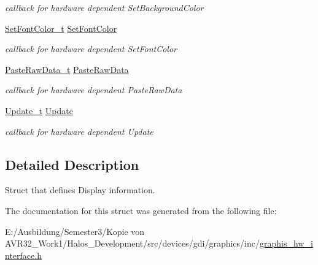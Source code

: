 \begin{CompactItemize}
\begin{CompactList}\small\item\em callback for hardware dependent SetBackgroundColor \item\end{CompactList}\item 
\hypertarget{struct_display_info__t_9b33d625be9a707ae9f45c0bd8577d61}{
\hyperlink{group__graphic__hw__interface_g2720234f07ba67eb55362ad2b1b3d102}{SetFontColor\_\-t} \hyperlink{struct_display_info__t_9b33d625be9a707ae9f45c0bd8577d61}{SetFontColor}}
\label{struct_display_info__t_9b33d625be9a707ae9f45c0bd8577d61}

\begin{CompactList}\small\item\em callback for hardware dependent SetFontColor \item\end{CompactList}\item 
\hypertarget{struct_display_info__t_22deda6e2dfa78c21ffe478d9b6199b8}{
\hyperlink{group__graphic__hw__interface_g23f1f3d777d2fee79309669dcd30cdac}{PasteRawData\_\-t} \hyperlink{struct_display_info__t_22deda6e2dfa78c21ffe478d9b6199b8}{PasteRawData}}
\label{struct_display_info__t_22deda6e2dfa78c21ffe478d9b6199b8}

\begin{CompactList}\small\item\em callback for hardware dependent PasteRawData \item\end{CompactList}\item 
\hypertarget{struct_display_info__t_848699324d7d18298a49440ad065dc51}{
\hyperlink{group__graphic__hw__interface_gd6ccf1837a820c03c88a134373cba158}{Update\_\-t} \hyperlink{struct_display_info__t_848699324d7d18298a49440ad065dc51}{Update}}
\label{struct_display_info__t_848699324d7d18298a49440ad065dc51}

\begin{CompactList}\small\item\em callback for hardware dependent Update \item\end{CompactList}\end{CompactItemize}


\subsection{Detailed Description}
Struct that defines Display information. 

The documentation for this struct was generated from the following file:\begin{CompactItemize}
\item 
E:/Ausbildung/Semester3/Kopie von AVR32\_\-Work1/Halos\_\-Development/src/devices/gdi/graphics/inc/\hyperlink{graphis__hw__interface_8h}{graphis\_\-hw\_\-interface.h}\end{CompactItemize}
